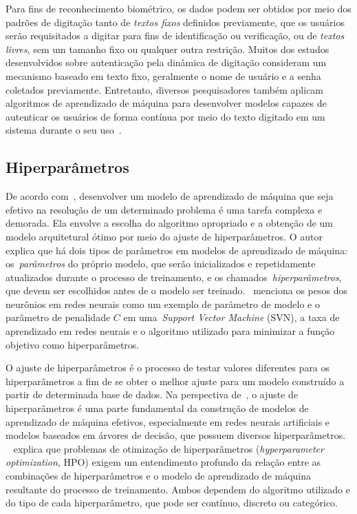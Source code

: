 Para fins de reconhecimento biométrico, os dados podem ser obtidos por meio dos padrões de digitação tanto de \textit{textos fixos} definidos previamente, que os usuários serão requisitados a digitar para fins de identificação ou verificação, ou de \textit{textos livres}, sem um tamanho fixo ou qualquer outra restrição. Muitos dos estudos desenvolvidos sobre autenticação pela dinâmica de digitação consideram um mecanismo baseado em texto fixo, geralmente o nome de usuário e a senha coletados previamente. Entretanto, diversos pesquisadores também aplicam algoritmos de aprendizado de máquina para desenvolver modelos capazes de autenticar os usuários de forma contínua por meio do texto digitado em um sistema durante o seu uso~\cite{continuous_auth_by_free_text_keystroke_based_on_cnn_and_rnn}.


\subsection{Hiperparâmetros}\label{subsec:ajuste_de_hiperparametros}

De acordo com~, desenvolver um modelo de aprendizado de máquina que seja efetivo na resolução de um determinado problema é uma tarefa complexa e demorada. Ela envolve a escolha do algoritmo apropriado e a obtenção de um modelo arquitetural ótimo por meio do ajuste de hiperparâmetros. O autor explica que há dois tipos de parâmetros em modelos de aprendizado de máquina: os~\textit{parâmetros} do próprio modelo, que serão inicializados e repetidamente atualizados durante o processo de treinamento, e os chamados~\textit{hiperparâmetros}, que devem ser escolhidos antes de o modelo ser treinado.~ menciona os pesos dos neurônios em redes neurais como um exemplo de parâmetro de modelo e o parâmetro de penalidade $C$ em uma~\textit{Support Vector Machine} (SVN), a taxa de aprendizado em redes neurais e o algoritmo utilizado para minimizar a função objetivo como hiperparâmetros.

O ajuste de hiperparâmetros é o processo de testar valores diferentes para os hiperparâmetros a fim de se obter o melhor ajuste para um modelo construído a partir de determinada base de dados. Na perspectiva de~, o ajuste de hiperparâmetros é uma parte fundamental da construção de modelos de aprendizado de máquina efetivos, especialmente em redes neurais artificiais e modelos baseados em árvores de decisão, que possuem diversos hiperparâmetros.
~ explica que problemas de otimização de hiperparâmetros (\textit{hyperparameter optimization}, HPO) exigem um entendimento profundo da relação entre as combinações de hiperparâmetros e o modelo de aprendizado de máquina resultante do processo de treinamento. Ambos dependem do algoritmo utilizado e do tipo de cada hiperparâmetro, que pode ser contínuo, discreto ou categórico.


